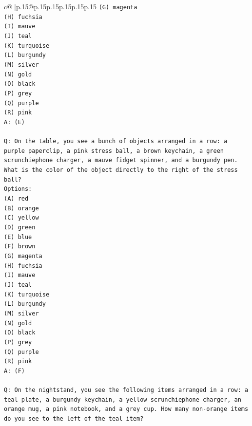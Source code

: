 \documentclass{article}
\begin{document}
{\begin{supertabular}{c@{$\;$}|p{.15\linewidth}@{}p{.15\linewidth}p{.15\linewidth}p{.15\linewidth}p{.15\linewidth}p{.15\linewidth}}
{{{\texttt{(G) magenta} \\
\texttt{(H) fuchsia} \\
\texttt{(I) mauve} \\
\texttt{(J) teal} \\
\texttt{(K) turquoise} \\
\texttt{(L) burgundy} \\
\texttt{(M) silver} \\
\texttt{(N) gold} \\
\texttt{(O) black} \\
\texttt{(P) grey} \\
\texttt{(Q) purple} \\
\texttt{(R) pink} \\
\texttt{A: (E)} \\
\\ 
\texttt{Q: On the table, you see a bunch of objects arranged in a row: a purple paperclip, a pink stress ball, a brown keychain, a green scrunchiephone charger, a mauve fidget spinner, and a burgundy pen. What is the color of the object directly to the right of the stress ball?} \\
\texttt{Options:} \\
\texttt{(A) red} \\
\texttt{(B) orange} \\
\texttt{(C) yellow} \\
\texttt{(D) green} \\
\texttt{(E) blue} \\
\texttt{(F) brown} \\
\texttt{(G) magenta} \\
\texttt{(H) fuchsia} \\
\texttt{(I) mauve} \\
\texttt{(J) teal} \\
\texttt{(K) turquoise} \\
\texttt{(L) burgundy} \\
\texttt{(M) silver} \\
\texttt{(N) gold} \\
\texttt{(O) black} \\
\texttt{(P) grey} \\
\texttt{(Q) purple} \\
\texttt{(R) pink} \\
\texttt{A: (F)} \\
\\ 
\texttt{Q: On the nightstand, you see the following items arranged in a row: a teal plate, a burgundy keychain, a yellow scrunchiephone charger, an orange mug, a pink notebook, and a grey cup. How many non{-}orange items do you see to the left of the teal item?} \\
}}}
\end{supertabular}}
\end{document}
